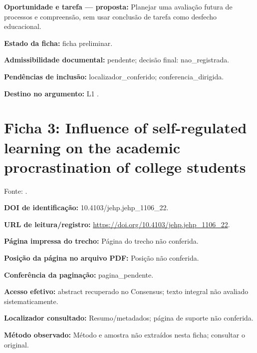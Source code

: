 \noindent\textbf{Oportunidade e tarefa — proposta:} Planejar uma avaliação futura de processos e compreensão, sem usar conclusão de tarefa como desfecho educacional.\par\medskip

\noindent\textbf{Estado da ficha:} ficha preliminar.\par\medskip

\noindent\textbf{Admissibilidade documental:} pendente; decisão final: nao\_registrada.\par\medskip

\noindent\textbf{Pendências de inclusão:} localizador\_conferido; conferencia\_dirigida.\par\medskip

\noindent\textbf{Destino no argumento:} L1 .

\clearpage\section*{Ficha 3: Influence of self-regulated learning on the academic procrastination of college students}

Fonte: \citet{education_brahma2023}.

\noindent\textbf{DOI de identificação:} 10.4103/jehp.jehp\_1106\_22.\par\medskip

\noindent\textbf{URL de leitura/registro:} \url{https://doi.org/10.4103/jehp.jehp_1106_22}.\par\medskip

\noindent\textbf{Página impressa do trecho:} Página do trecho não conferida.\par\medskip

\noindent\textbf{Posição da página no arquivo PDF:} Posição não conferida.\par\medskip

\noindent\textbf{Conferência da paginação:} pagina\_pendente.\par\medskip

\noindent\textbf{Acesso efetivo:} abstract recuperado no Consensus; texto integral não avaliado sistematicamente.\par\medskip

\noindent\textbf{Localizador consultado:} Resumo/metadados; página de suporte não conferida.\par\medskip

\noindent\textbf{Método observado:} Método e amostra não extraídos nesta ficha; consultar o original.\par\medskip

